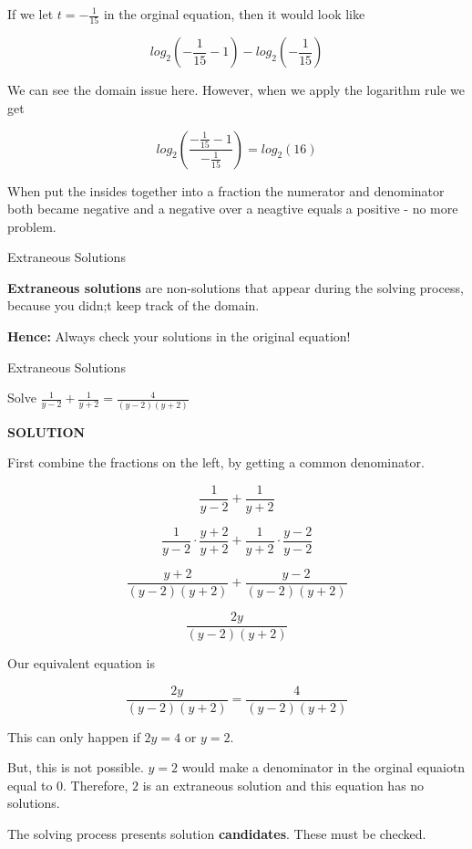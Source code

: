 \documentclass{ximera}
\begin{document}
If we let $t = -\frac{1}{15}$ in the orginal equation, then it would look like 


\[    log_2\left(-\frac{1}{15}-1\right) - log_2\left(-\frac{1}{15}\right)   \]

We can see the domain issue here.  However, when we apply the logarithm rule we get



\[   log_2\left(\frac{-\frac{1}{15}-1}{-\frac{1}{15}}\right)    = log_2(16)  \]


When put the insides together into a fraction the numerator and denominator both became negative and a negative over a neagtive equals a positive - no more problem.





\begin{definition} Extraneous Solutions

\textbf{Extraneous solutions} are non-solutions that appear during the solving process, because you didn;t keep track of the domain.

\end{definition}

\textbf{Hence:} Always check your solutions in the original equation!







\begin{example} Extraneous Solutions


Solve $\frac{1}{y-2} + \frac{1}{y+2} = \frac{4}{(y-2)(y+2)}$


\textbf{\textcolor{purple!50!blue!90!black}{SOLUTION}}



First combine the fractions on the left, by getting a common denominator.



\[    \frac{1}{y-2} + \frac{1}{y+2}        \]

\[    \frac{1}{y-2} \cdot \frac{y+2}{y+2} + \frac{1}{y+2}  \cdot \frac{y-2}{y-2}       \]

\[    \frac{y+2}{(y-2)(y+2)} + \frac{y-2}{(y-2)(y+2)}      \]

\[    \frac{2y}{(y-2)(y+2)}     \]

Our equivalent equation is


\[    \frac{2y}{(y-2)(y+2)}   = \frac{4}{(y-2)(y+2)}   \]


This can only happen if $2y = 4$ or $y = 2$.

But, this is not possible.  $y=2$ would make a denominator in the orginal equaiotn equal to $0$.  Therefore, $2$ is an extraneous solution and this equation has no solutions.


\end{example}
The solving process presents solution \textbf{candidates}.  These must be checked.
\end{document}
